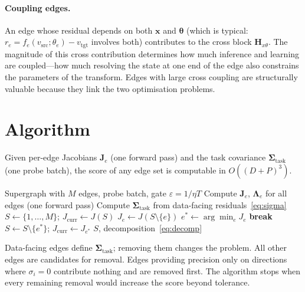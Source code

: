 \documentclass[11pt, a4paper]{article}
\newcommand{\bx}{\bm{x}}
\newcommand{\btheta}{\bm{\theta}}
\begin{document}
\paragraph{Coupling edges.}
An edge whose residual depends on both $\bx$ and $\btheta$ (which is typical: $r_e = f_e(v_{\mathrm{src}};\theta_e) - v_{\mathrm{tgt}}$ involves both) contributes to the cross block $\bm{H}_{x\theta}$.
The magnitude of this cross contribution determines how much inference and learning are coupled---how much resolving the state at one end of the edge also constrains the parameters of the transform.
Edges with large cross coupling are structurally valuable because they link the two optimisation problems.

\section{Algorithm}

Given per-edge Jacobians $\bm{J}_e$ (one forward pass) and the task covariance $\bm{\Sigma}_{\mathrm{task}}$ (one probe batch), the score of any edge set is computable in $O((D{+}P)^3)$.

\begin{algorithm}[t]
\caption{Backward Elimination via Hessian Matching}
\label{alg:main}
\begin{algorithmic}[1]
\REQUIRE Supergraph with $M$ edges, probe batch, gate $\varepsilon = 1/\eta T$
\STATE Compute $\bm{J}_e$, $\bm{\Lambda}_e$ for all edges (one forward pass)
\STATE Compute $\bm{\Sigma}_{\mathrm{task}}$ from data-facing residuals~\eqref{eq:sigma}
\STATE $S \leftarrow \{1,\dots,M\}$; \; $J_{\mathrm{curr}} \leftarrow J(S)$
\REPEAT
        \STATE $J_e \leftarrow J(S \setminus \{e\})$ \hfill{}
    \ENDFOR
    \STATE $e^* \leftarrow \arg\min_e J_e$
        \STATE \textbf{break}
    \ENDIF
    \STATE $S \leftarrow S \setminus \{e^*\}$; \; $J_{\mathrm{curr}} \leftarrow J_{e^*}$
\RETURN $S$, decomposition~\eqref{eq:decomp}
\end{algorithmic}
\end{algorithm}

Data-facing edges define $\bm{\Sigma}_{\mathrm{task}}$; removing them changes the problem.
All other edges are candidates for removal.
Edges providing precision only on directions where $\sigma_i = 0$ contribute nothing and are removed first.
The algorithm stops when every remaining removal would increase the score beyond tolerance.
\end{document}
